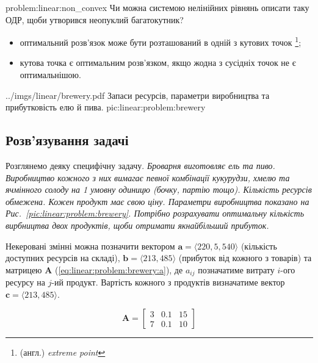 \documentclass[\main/book.tex]{subfiles}
\begin{document}
\begin{problem}{problem:linear:non_convex}
 Чи можна системою нелінійних рівнянь описати таку ОДР, щоби утворився неопуклий багатокутник?
\end{problem}

\begin{conclusions}
\begin{itemize}
 \item оптимальний розв'язок може бути розташований в одній з кутових точок \footnote{(англ.) \textit{extreme point}};
 \item кутова точка є оптимальним розв'язком, якщо жодна з сусідніх точок не є оптимальнішою.
\end{itemize}
\label{conclusion:linear:optimal_solution}
\end{conclusions}

\illustration
 {../imgs/linear/brewery.pdf}
 {Запаси ресурсів, параметри ви\-роб\-ниц\-тва та прибутковість елю й пива.}
 {pic:linear:problem:brewery}

\subsection{Розв'язування задачі}

Розглянемо деяку специфічну задачу. \textit{Броварня виготовляє ель та пиво. Виробництво кожного з них вимагає певної комбінації кукурудзи, хмелю та ячмінного солоду на 1 умовну одиницю (бочку, партію тощо). Кількість ресурсів обмежена. Кожен продукт має свою ціну. Параметри виробництва показано на Рис.~\ref{pic:linear:problem:brewery}. Потрібно розрахувати оптимальну кількість вирбництва двох продуктів, щоби отримати якнайбільший прибуток.}

Некеровані змінні можна позначити вектором $\mathbf{a} = {\langle 220, 5, 540 \rangle}$ (кількість доступних ресурсів на складі), $\mathbf{b} = {\langle 213, 485 \rangle}$ (прибуток від кожного з товарів) та матрицею $\mathbf{A}$ (\ref{eq:linear:problem:brewery:a}), де $a_{ij}$ позначатиме витрату $i$-ого ресурсу на $j$-ий продукт. Вартість кожного з продуктів визначатиме вектор $\mathbf{c} = {\langle 213, 485 \rangle}$.

\begin{equation}
 \mathbf{A} = \begin{bmatrix}
               3 & 0.1 & 15 \\
               7 & 0.1 & 10
              \end{bmatrix}
 \label{eq:linear:problem:brewery:a}
\end{equation}
\end{document}
